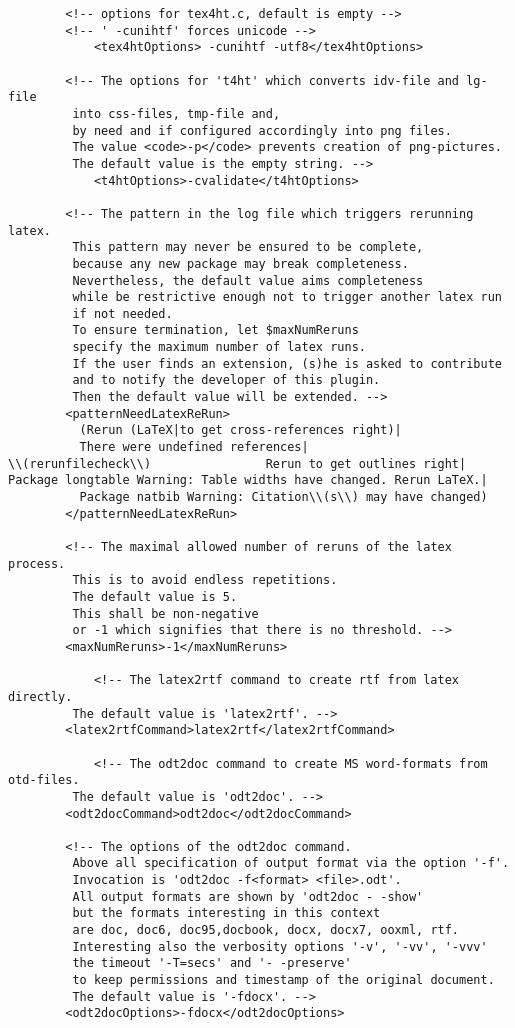 \documentclass[12pt]{article}
\begin{document}
\begin{lstlisting}
	    <!-- options for tex4ht.c, default is empty -->
	    <!-- ' -cunihtf' forces unicode -->
            <tex4htOptions> -cunihtf -utf8</tex4htOptions>

	    <!-- The options for 't4ht' which converts idv-file and lg-file 
		 into css-files, tmp-file and, 
		 by need and if configured accordingly into png files. 
		 The value <code>-p</code> prevents creation of png-pictures.
		 The default value is the empty string. -->
            <t4htOptions>-cvalidate</t4htOptions>

	    <!-- The pattern in the log file which triggers rerunning latex. 
		 This pattern may never be ensured to be complete, 
		 because any new package may break completeness. 
		 Nevertheless, the default value aims completeness 
		 while be restrictive enough not to trigger another latex run 
		 if not needed. 
		 To ensure termination, let $maxNumReruns 
		 specify the maximum number of latex runs. 
		 If the user finds an extension, (s)he is asked to contribute 
		 and to notify the developer of this plugin. 
		 Then the default value will be extended. -->
	    <patternNeedLatexReRun>
	      (Rerun (LaTeX|to get cross-references right)|
	      There were undefined references|
\\(rerunfilecheck\\)                Rerun to get outlines right|
Package longtable Warning: Table widths have changed. Rerun LaTeX.|
	      Package natbib Warning: Citation\\(s\\) may have changed)
	    </patternNeedLatexReRun>

	    <!-- The maximal allowed number of reruns of the latex process. 
		 This is to avoid endless repetitions. 
		 The default value is 5. 
		 This shall be non-negative 
		 or -1 which signifies that there is no threshold. -->
	    <maxNumReruns>-1</maxNumReruns>

            <!-- The latex2rtf command to create rtf from latex directly. 
		 The default value is 'latex2rtf'. -->
	    <latex2rtfCommand>latex2rtf</latex2rtfCommand>

            <!-- The odt2doc command to create MS word-formats from otd-files. 
		 The default value is 'odt2doc'. -->
	    <odt2docCommand>odt2doc</odt2docCommand>

	    <!-- The options of the odt2doc command. 
		 Above all specification of output format via the option '-f'. 
		 Invocation is 'odt2doc -f<format> <file>.odt'. 
		 All output formats are shown by 'odt2doc - -show' 
		 but the formats interesting in this context 
		 are doc, doc6, doc95,docbook, docx, docx7, ooxml, rtf. 
		 Interesting also the verbosity options '-v', '-vv', '-vvv' 
		 the timeout '-T=secs' and '- -preserve' 
		 to keep permissions and timestamp of the original document. 
		 The default value is '-fdocx'. -->
	    <odt2docOptions>-fdocx</odt2docOptions>


\end{lstlisting}
\end{document}
